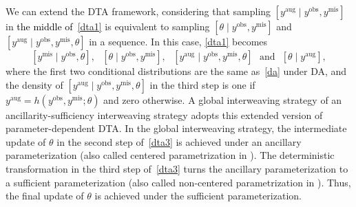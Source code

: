\documentclass[12pt]{article}
\begin{document}
We can  extend the DTA framework, considering that sampling  $[y^{\textrm{aug}}\mid y^{\textrm{obs}}, y^{\textrm{mis}}]$ in \textcolor{black}{the middle of}~\eqref{dta1} is equivalent to  sampling $[\theta \mid y^{\textrm{obs}}, y^{\textrm{mis}}]$ and $[y^{\textrm{aug}}\mid y^{\textrm{obs}}, y^{\textrm{mis}}, \theta]$ in a sequence. In this case, \eqref{dta1} becomes
\begin{equation}\label{dta3}
[y^{\textrm{mis}}\mid y^{\textrm{obs}}, \theta],~~~  [\theta \mid y^{\textrm{obs}}, y^{\textrm{mis}}],~~~ [y^{\textrm{aug}}\mid y^{\textrm{obs}}, y^{\textrm{mis}}, \theta]~~~\textrm{and}~~~  [\theta\mid y^{\textrm{aug}}],
\end{equation}
where the first two conditional distributions are the same as~\eqref{da} under DA, and the density of $[y^{\textrm{aug}}\mid y^{\textrm{obs}}, y^{\textrm{mis}}, \theta]$ in the third step is one if $y^{\textrm{aug}}=h(y^{\textrm{obs}}, y^{\textrm{mis}}; \theta)$ and zero otherwise. A global interweaving strategy of an ancillarity-sufficiency interweaving strategy \citep{yu2011} adopts this extended version of parameter-dependent DTA. In the global interweaving strategy, the intermediate update of $\theta$ in the second step of~\eqref{dta3} is achieved under an ancillary parameterization (also called centered parametrization in \cite{papa2007repara}). The  deterministic transformation in the third step of~\eqref{dta3} turns the ancillary parameterization to a sufficient parameterization (also called non-centered parametrization in \cite{papa2007repara}). Thus, the final update of $\theta$ is achieved under the sufficient parameterization. 



\end{document}

